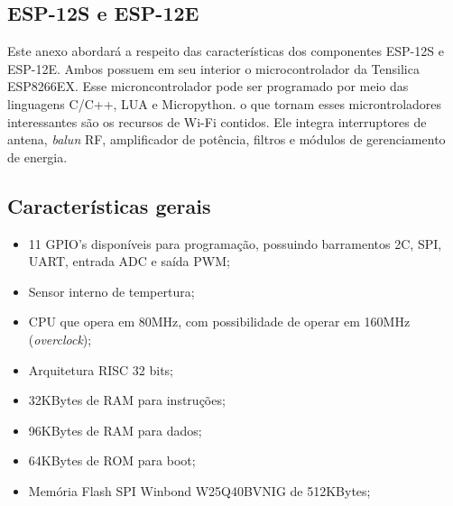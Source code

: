 
\begin{anexosenv}
\partanexos

\chapter{ESP-12S e ESP-12E}     %
\label{chap:anexoA}





Este anexo abordará a respeito das características dos componentes ESP-12S e ESP-12E. Ambos possuem em seu interior o microcontrolador da Tensilica ESP8266EX. Esse microncontrolador pode ser programado por meio das linguagens C/C++, LUA e Micropython\cite{Embarcados}. o que tornam esses microntroladores interessantes são os recursos de Wi-Fi contidos. Ele integra interruptores de antena, \textit{balun} RF, amplificador de potência, filtros e módulos de gerenciamento de energia.

\section{Características gerais}

\begin{itemize}
	\item 11 GPIO's disponíveis para programação, possuindo barramentos 2C, SPI, UART, entrada ADC e saída PWM;
	\item Sensor interno de tempertura;
	\item CPU que opera em 80MHz, com possibilidade de operar em 160MHz (\textit{overclock});
	\item Arquitetura RISC 32 bits;
	\item 32KBytes de RAM para instruções;
	\item 96KBytes de RAM para dados;
	\item 64KBytes de ROM para boot;
	\item Memória Flash SPI Winbond W25Q40BVNIG de 512KBytes;
\end{itemize}


\end{anexosenv}
